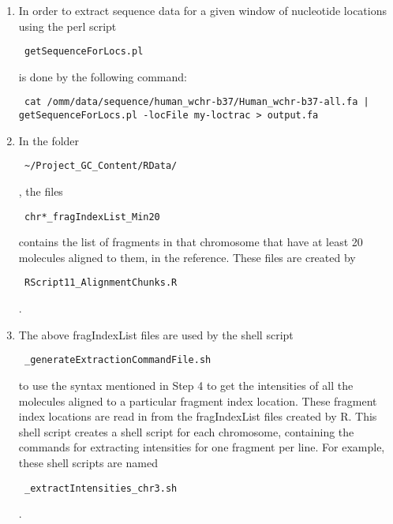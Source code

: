 \documentclass[11pt]{article}
\begin{document}
\begin{enumerate}
\item
In order to extract sequence data for a given window of nucleotide locations using the perl script \begin{verbatim} getSequenceForLocs.pl \end{verbatim} 
is done by the following command:
\begin{verbatim} cat /omm/data/sequence/human_wchr-b37/Human_wchr-b37-all.fa | 
getSequenceForLocs.pl -locFile my-loctrac > output.fa 
\end{verbatim}

\item
In the folder \begin{verbatim} ~/Project_GC_Content/RData/ \end{verbatim}, 
the files \begin{verbatim} chr*_fragIndexList_Min20 \end{verbatim} 
contains the list of fragments in that chromosome that have at least 20 molecules aligned to them, in the reference. These files are created by \begin{verbatim} RScript11_AlignmentChunks.R \end{verbatim}. 

\item
The above fragIndexList files are used by the shell script \begin{verbatim} _generateExtractionCommandFile.sh \end{verbatim}
to use the syntax mentioned in Step 4 to get the intensities of all the molecules aligned to a particular fragment index location. These fragment index locations are read in from the fragIndexList files created by R. This shell script creates a shell script for each chromosome, containing the commands for extracting intensities for one fragment per line. For example, these shell scripts are named \begin{verbatim} _extractIntensities_chr3.sh \end{verbatim}.


\end{enumerate}
\end{document}
